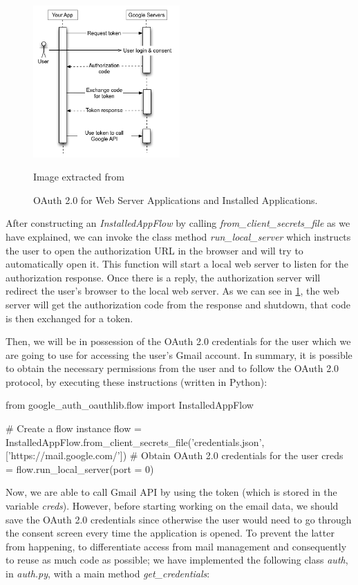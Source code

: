 \begin{figure}[h]
	\centering%
	\includegraphics[width = 0.5\textwidth]{Imagenes/Bitmap/webflow.png}%
	\caption{OAuth 2.0 for Web Server Applications and Installed Applications.}%
	Image extracted from \cite{oauth}
	\label{fig:oauth}
\end{figure}

After constructing an \textit{InstalledAppFlow} by calling \textit{from\_client\_secrets\_file} as we have explained, we can invoke the class method \textit{run\_local\_server} which instructs the user to open the authorization URL in the browser and will try to automatically open it. This function will start a local web server to listen for the authorization response. Once there is a reply, the authorization server will redirect the user's browser to the local web server. As we can see in \ref{fig:oauth}, the web server will get the authorization code from the response and shutdown, that code is then exchanged for a token.

Then, we will be in possession of the OAuth 2.0 credentials for the user \citep{oauth2.credentials} which we are going to use for accessing the user's Gmail account. In summary, it is possible to obtain the necessary permissions from the user and to follow the OAuth 2.0 protocol, by executing these instructions (written in Python):

\begin{python}
from google_auth_oauthlib.flow import InstalledAppFlow

# Create a flow instance
flow = InstalledAppFlow.from_client_secrets_file('credentials.json', 
	['https://mail.google.com/'])
# Obtain OAuth 2.0 credentials for the user
creds = flow.run_local_server(port = 0)
\end{python}

Now, we are able to call Gmail API by using the token (which is stored in the variable \textit{creds}). However, before starting working on the email data, we should save the OAuth 2.0 credentials since otherwise the user would need to go through the consent screen every time the application is opened. To prevent the latter from happening, to differentiate access from mail management and consequently to reuse as much code as possible; we have implemented the following class \textit{auth}, in \textit{auth.py}, with a main method \textit{get\_credentials}:

